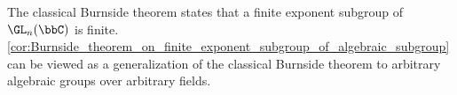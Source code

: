     \begin{remark}\label{rmk:Burnside_theorem_on_finite_exponential_subgroup_of_algebraic_subgroup_and_matrix_group}
        The classical Burnside theorem states that a finite exponent subgroup of \(\GL_n(\bbC)\) is finite.
        \cref{cor:Burnside_theorem_on_finite_exponent_subgroup_of_algebraic_subgroup} can be viewed as a generalization of the classical Burnside theorem to arbitrary algebraic groups over arbitrary fields.
    \end{remark}

